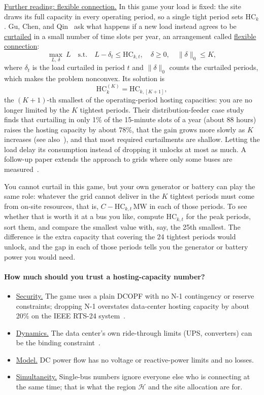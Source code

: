 \documentclass[10pt]{article}
\newcommand{\alert}[1]{{\color{alertblue}\uline{#1}}}
\newcommand{\MW}{\ensuremath{\,\mathrm{MW}}}
\begin{document}
\alert{Further reading: flexible connection.} In this game your load is
fixed: the site draws its full capacity in every operating period, so a single
tight period sets $\mathrm{HC}_k$. Gu, Chen, and Qin~\cite{gu2026flexible} ask
what happens if a new load instead agrees to be \alert{curtailed} in a small
number of time slots per year, an arrangement called \alert{flexible connection}:
\[
  \max_{L,\,\delta}\ L \quad \text{s.t.}\quad L - \delta_t \le \mathrm{HC}_{k,t},\quad
  \delta \ge 0,\quad \|\delta\|_0 \le K,
\]
where $\delta_t$ is the load curtailed in period $t$ and $\|\delta\|_0$ counts
the curtailed periods, which makes the problem nonconvex. Its solution is
\[
  \mathrm{HC}_k^{(K)} = \mathrm{HC}_{k,[K+1]},
\]
the $(K+1)$-th smallest of the operating-period hosting capacities: you are no
longer limited by the $K$ tightest periods. Their distribution-feeder case study
finds that curtailing in only 1\% of the 15-minute slots of a year (about 88
hours) raises the hosting capacity by about 78\%, that the gain grows more
slowly as $K$ increases (see also~\cite{sarker2026risk}),
and that most required curtailments are shallow. Letting the load delay its
consumption instead of dropping it unlocks at most as much. A follow-up paper
extends the approach to grids where only some buses are
measured~\cite{gu2026partial}.

You cannot curtail in this game, but your own generator or battery can play the
same role: whatever the grid cannot deliver in the $K$ tightest periods must
come from on-site resources, that is, $C - \mathrm{HC}_{k,t}$\MW{} in each of
those periods. To see whether that is worth it at a bus you like, compute
$\mathrm{HC}_{k,t}$ for the peak periods, sort them, and compare the smallest
value with, say, the 25th smallest. The difference is the extra capacity that
covering the 24 tightest periods would unlock, and the gap in each of those
periods tells you the generator or battery power you would need.

\paragraph{How much should you trust a hosting-capacity number?}
\begin{itemize}[leftmargin=*]
  \item \alert{Security.} The game uses a plain DCOPF with no N-1 contingency
    or reserve constraints; dropping N-1 overstates data-center hosting capacity
    by about 20\% on the IEEE RTS-24 system~\cite{wan2026hosting}.
  \item \alert{Dynamics.} The data center's own ride-through limits (UPS,
    converters) can be the binding constraint~\cite{ren2026ride}.
  \item \alert{Model.} DC power flow has no voltage or reactive-power limits
    and no losses.
  \item \alert{Simultaneity.} Single-bus numbers ignore everyone else who is
    connecting at the same time; that is what the region $\mathcal H$ and the
    site allocation are for.
\end{itemize}
\end{document}
